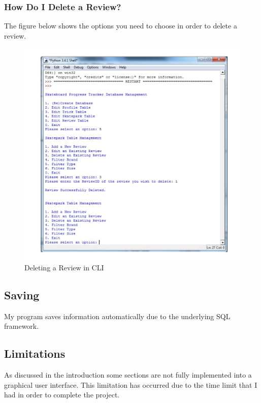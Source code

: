\subsubsection{How Do I Delete a Review?}

The figure below shows the options you need to choose in order to delete a review.

\begin{figure}[H]
    \includegraphics[width=\textwidth]{./Manual/Images/DeleteReview.pdf}
    \caption{Deleting a Review in CLI} \label{fig:Delete Review}
\end{figure}


\subsection{Saving}

My program saves information automatically due to the underlying SQL framework.

\subsection{Limitations}

As discussed in the introduction some sections are not fully implemented into a graphical user interface. This limitation has occurred due to the time limit that I had in order to complete the project.





